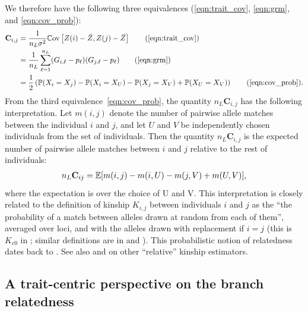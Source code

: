 We therefore have the following three equivalences
(\ref{eqn:trait_cov}, \ref{eqn:grm}, and \ref{eqn:cov_prob}):
%
\begin{align} \label{eqn:equivalence}
    \mathbf{C}_{i,j} &= \frac{1}{n_L \sigma^2}\Cov\left[Z(i) - \bar{Z}, Z(j) - \bar{Z}\right] \tag{\ref{eqn:trait_cov}} \\
                     &= \frac{1}{n_L}\sum_{\ell=1}^{n_L} (G_{i,\ell} - p_\ell)(G_{j,\ell} - p_\ell) \tag{\ref{eqn:grm}} \\
                     &= \frac{1}{2}\left(\P(X_i = X_j) - \P(X_i = X_U) - \P(X_j = X_V) + \P(X_U = X_V) \right) \tag{\ref{eqn:cov_prob}}.
\end{align}
%
From the third equivalence~\eqref{eqn:cov_prob},
the quantity $n_L\mathbf{C}_{i,j}$ has the following interpretation.
%
Let $m(i,j)$ denote the number of pairwise allele matches between
the individual $i$ and $j$,
and let $U$ and $V$ be independently chosen individuals from the set of individuals.
%
Then the quantity $n_L\mathbf{C}_{i,j}$
is the expected number of pairwise allele matches between $i$ and $j$
relative to the rest of individuals:
%
\begin{align} \label{eqn:relative_allele_matches}
    n_L \mathbf{C}_{ij} = \mathbb{E}[m(i,j) - m(i,U) - m(j,V) + m(U,V)],
\end{align}
%
where the expectation is over the choice of U and V.
%
This interpretation is closely related to the definition of kinship $K_{i,j}$
between individuals $i$ and $j$ as the
``the probability of a match between alleles drawn at random from each of them'',
averaged over loci, and with the alleles drawn with replacement if $i=j$
(this is $K_{c0}$ in \citet{speed2015relatedness};
similar definitions are in \citet{vanraden2008efficient} and \citet{yang2010common}).
%
This probabilistic notion of relatedness dates back to \citet{malecot1969mathemathics}.
%
See also \citet{weir2017unified, weir2018how} and \citet{ochoa2021estimating} on
other ``relative'' kinship estimators.


\subsection{A trait-centric perspective on the branch relatedness}

